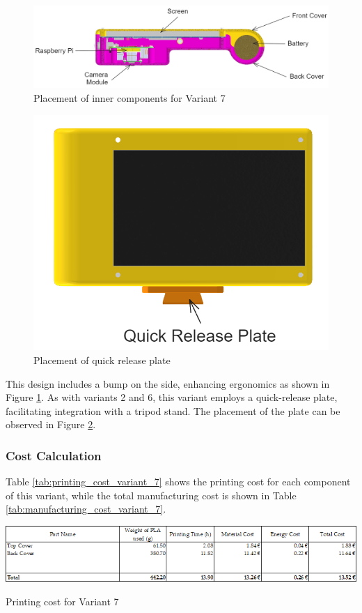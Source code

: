\begin{figure}[!ht]
    \centering
    \includegraphics[height=3 cm]{texs/Part1/chapter4/image/v72.png}
    \caption{Placement of inner components for Variant 7}
    \label{fig:variant7_inner_components}
\end{figure}

\begin{figure}[!ht]
    \centering
    \includegraphics[height=5 cm]{texs/Part1/chapter4/image/v73.png}
    \caption{Placement of quick release plate}
    \label{fig:variant7_quick_release_plate}
\end{figure}

This design includes a bump on the side, enhancing ergonomics as shown in Figure \ref{fig:variant7_inner_components}. As with variants 2 and 6, this variant employs a quick-release plate, facilitating integration with a tripod stand. The placement of the plate can be observed in Figure \ref{fig:variant7_quick_release_plate}.

\subsubsection{Cost Calculation}
Table \ref{tab:printing_cost_variant_7} shows the printing cost for each component of this variant, while the total manufacturing cost is shown in Table \ref{tab:manufacturing_cost_variant_7}.

\begin{table}[H]
    \centering
    \includegraphics[width=\linewidth]{texs/Part1/chapter3/image/v7printed.png}
    \caption{Printing cost for Variant 7}
    \label{tab:printing_cost_variant_7}
\end{table}

